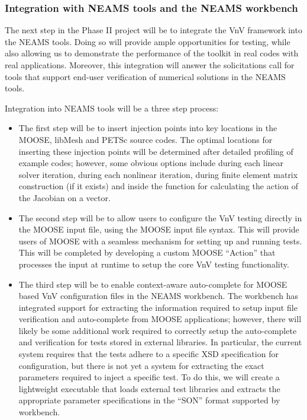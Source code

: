 \subsubsection{Integration with NEAMS tools and the NEAMS workbench} 

The next step in the Phase II project will be to integrate the VnV framework into the NEAMS 
tools. Doing so will provide ample opportunities for testing, while also allowing us to demonstrate the performance of the toolkit in real codes with
real applications. Moreover, this integration will answer the solicitations call for tools that support end-user verification of numerical solutions in the NEAMS tools. 

Integration into NEAMS tools will be a three step process:

\begin{itemize}
 \item The first step will be to insert injection points into key locations in the MOOSE, libMesh and PETSc source codes. The optimal locations for 
 inserting these injection points will be determined after detailed profiling of example codes; however, some obvious options include during each linear 
 solver iteration, during each nonlinear iteration, during finite element matrix construction (if it exists) and inside the function for calculating the action of the Jacobian
 on a vector. 
 \item The second step will be to allow users to configure the VnV testing directly in the MOOSE input file, using the MOOSE input
file syntax. This will provide users of MOOSE with a seamless mechanism for setting up and running tests. This will be completed by
developing a custom MOOSE ``Action'' that processes the input at runtime to setup the core VnV testing functionality. 
\item The third step will be to enable context-aware auto-complete for MOOSE based VnV configuration files in the NEAMS workbench. The workbench
has integrated support for extracting the information required to setup input file verification and auto-complete from MOOSE applications; however, there
will likely be some additional work required to correctly setup the auto-complete and verification for tests stored in external libraries. In particular, the current system 
requires that the tests adhere to a specific XSD specification for configuration, but there is not yet a system for extracting the exact parameters required to inject a specific test. To do this, we will create a lightweight executable that loads external test libraries and extracts the appropriate parameter specifications in the ``SON'' format supported by workbench.  

\end{itemize}
